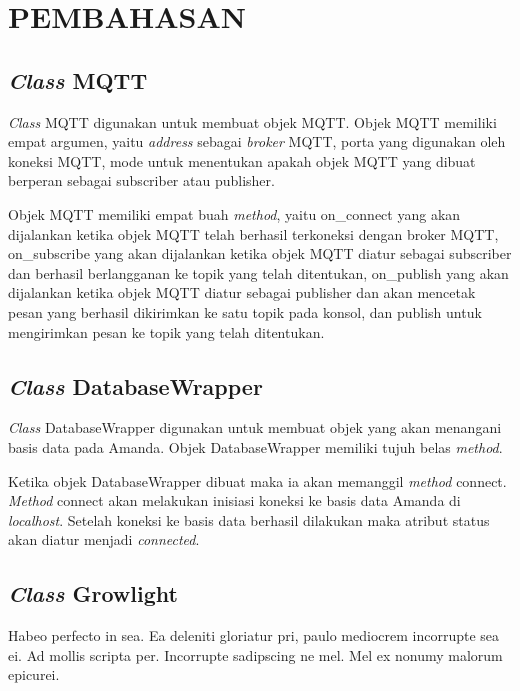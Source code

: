 
\chapter{PEMBAHASAN}

\section{\textit{Class} MQTT}
\textit{Class} MQTT digunakan untuk membuat objek MQTT. Objek MQTT memiliki empat argumen, yaitu \textit{address} sebagai \textit{broker} MQTT, porta yang digunakan oleh koneksi MQTT, mode untuk menentukan apakah objek MQTT yang dibuat berperan sebagai subscriber atau publisher.

Objek MQTT memiliki empat buah \textit{method}, yaitu on\_connect yang akan dijalankan ketika objek MQTT telah berhasil terkoneksi dengan broker MQTT, on\_subscribe yang akan dijalankan ketika objek MQTT diatur sebagai subscriber dan berhasil berlangganan ke topik yang telah ditentukan, on\_publish yang akan dijalankan ketika objek MQTT diatur sebagai publisher dan akan mencetak pesan yang berhasil dikirimkan ke satu topik pada konsol, dan publish untuk mengirimkan pesan ke topik yang telah ditentukan.

\section{\textit{Class} DatabaseWrapper}
\textit{Class} DatabaseWrapper digunakan untuk membuat objek yang akan menangani basis data pada Amanda. Objek DatabaseWrapper memiliki tujuh belas \textit{method}.

Ketika objek DatabaseWrapper dibuat maka ia akan memanggil \textit{method} connect. \textit{Method} connect akan melakukan inisiasi koneksi ke basis data Amanda di \textit{localhost}. Setelah koneksi ke basis data berhasil dilakukan maka atribut status akan diatur menjadi \textit{connected}.

\section{\textit{Class} Growlight}
Habeo perfecto in sea. Ea deleniti gloriatur pri, paulo mediocrem incorrupte sea ei. Ad mollis scripta per. Incorrupte sadipscing ne mel. Mel ex nonumy malorum epicurei.

